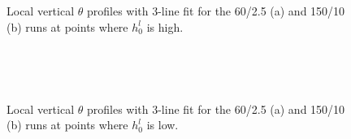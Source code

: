 \begin{figure}[htbp]
\begin{minipage}[b]{0.5\linewidth}
        \\
        \end{minipage}             
\quad
\begin{minipage}[b]{0.5\linewidth}
        \\
       
       \end{minipage}
\caption[High local \acs{ML}]{Local vertical $\theta$ profiles with 3-line fit for the 60/2.5 (a) and 150/10 (b) runs at 
points where $h^{l}_{0}$ is high.}
        
        \label{fig:rssfitshigh}
\end{figure}

\begin{figure}[htbp]
        
\begin{minipage}[b]{0.5\linewidth}
        \\

        \end{minipage}             
\quad
\begin{minipage}[b]{0.5\linewidth}
        \\
       
       \end{minipage}
\caption[Low local \acs{ML}]{Local vertical $\theta$ profiles with 3-line fit for the 60/2.5 (a) and 150/10 (b) runs at 
points where $h^{l}_{0}$ is low.}
        \label{fig:rssfitslow}
\end{figure}


